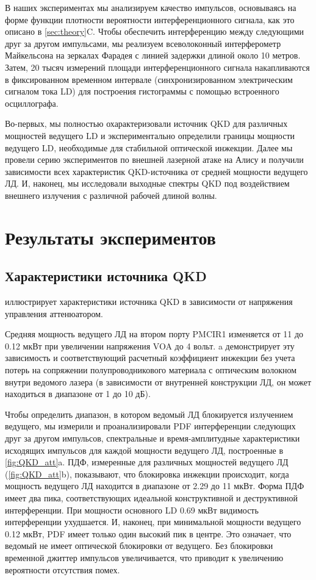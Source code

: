 В наших экспериментах мы анализируем качество импульсов, основываясь на форме функции плотности вероятности интерференционного сигнала, как это описано в \cref{sec:theory}C. Чтобы обеспечить интерференцию между следующими друг за другом импульсами, мы реализуем всеволоконный интерферометр Майкельсона на зеркалах Фарадея с линией задержки длиной около 10 метров. Затем, 20 тысяч  измерений площади интерференционного сигнала накапливаются в фиксированном временном интервале (синхронизированном электрическим сигналом тока LD) для построения гистограммы с помощью встроенного осциллографа.

Во-первых, мы полностью охарактеризовали источник QKD для различных мощностей ведущего LD и экспериментально определили границы мощности ведущего LD, необходимые для стабильной оптической инжекции. Далее мы провели серию экспериментов по внешней лазерной атаке на Алису и получили зависимости всех характеристик QKD-источника от средней мощности ведущего ЛД. И, наконец, мы исследовали выходные спектры QKD под воздействием внешнего излучения с различной рабочей длиной волны.
\section{Результаты экспериментов}
\label{sec:results}

\subsection{Характеристики источника QKD}

 иллюстрирует характеристики источника QKD в зависимости от напряжения управления аттенюатором.

Средняя мощность ведущего ЛД на втором порту PMCIR1 изменяется от 11 до 0.12 мкВт при увеличении напряжения VOA до 4 вольт. a демонстрирует эту зависимость и соответствующий расчетный коэффициент инжекции без учета потерь на сопряжении полупроводникового материала с оптическим волокном внутри ведомого лазера (в зависимости от внутренней конструкции ЛД, он может находиться в диапазоне от 1 до 10 дБ). 

Чтобы определить диапазон, в котором ведомый ЛД блокируется излучением ведущего, мы измерили и проанализировали PDF интерференции следующих друг за другом импульсов, спектральные и время-амплитудные характеристики исходящих импульсов для каждой мощности ведущего ЛД, построенные в \cref{fig:QKD_att}a. ПДФ, измеренные для различных мощностей ведущего ЛД (\cref{fig:QKD_att}b), показывают, что блокировка инжекции происходит, когда мощность ведущего ЛД находится в диапазоне от 2.29 до 11 мкВт.  Форма ПДФ имеет два пика, соответствующих идеальной конструктивной и деструктивной интерференции. При мощности основного LD 0.69 мкВт видимость интерференции ухудшается. И, наконец, при минимальной мощности ведущего 0.12 мкВт, PDF имеет только один высокий пик в центре. Это означает, что ведомый не имеет оптической блокировки от ведущего. Без блокировки временной джиттер импульсов увеличивается, что приводит к увеличению вероятности отсутствия помех.

